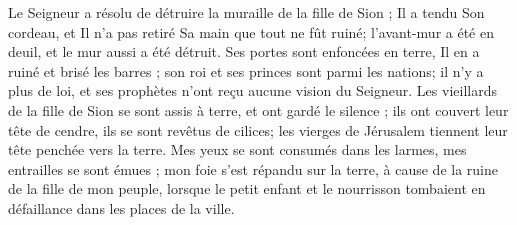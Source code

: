 Le Seigneur a résolu de détruire la muraille de la fille de Sion ; Il a tendu Son cordeau, et Il n'a pas retiré Sa main que tout ne fût ruiné; l'avant-mur a été en deuil, et le mur aussi a été détruit.
Ses portes sont enfoncées en terre, Il en a ruiné et brisé les barres ; son roi et ses princes sont parmi les nations; il n'y a plus de loi, et ses prophètes n'ont reçu aucune vision du Seigneur.
Les vieillards de la fille de Sion se sont assis à terre, et ont gardé le silence ; ils ont couvert leur tête de cendre, ils se sont revêtus de cilices; les vierges de Jérusalem tiennent leur tête penchée vers la terre.
Mes yeux se sont consumés dans les larmes, mes entrailles se sont émues ; mon foie s'est répandu sur la terre, à cause de la ruine de la fille de mon peuple, lorsque le petit enfant et le nourrisson tombaient en défaillance dans les places de la ville.